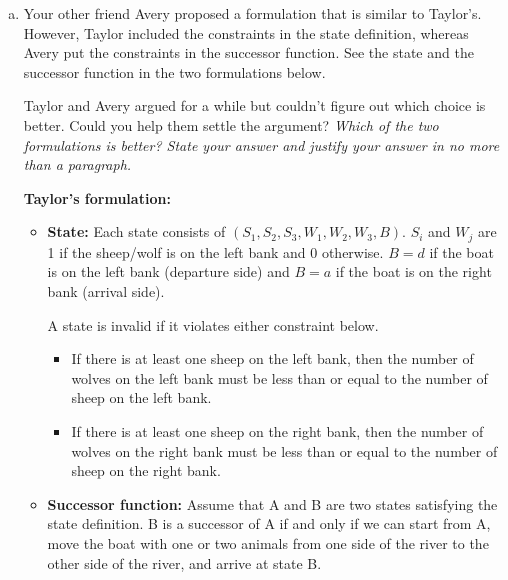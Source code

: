\documentclass[12pt]{article}
\begin{document}
\begin{enumerate}[(a)]
\item
\label{mc_part_critique_formulation_2}
Your other friend Avery proposed a formulation that is similar to Taylor's. However, Taylor included the constraints in the state definition, whereas Avery put the constraints in the successor function. See the state and the successor function in the two formulations below.

Taylor and  Avery argued for a while but couldn't figure out which choice is better. Could you help them settle the argument? {\em Which of the two formulations is better? State your answer and justify your answer in no more than a paragraph.}

\begin{example}
{\bf Taylor's formulation:}

\begin{itemize}
\item
{\bf State:} Each state consists of $(S_1, S_2, S_3, W_1, W_2, W_3, B)$. $S_i$ and $W_j$ are 1 if the sheep/wolf is on the left bank and 0 otherwise. $B = d$ if the boat is on the left bank (departure side) and $B = a$ if the boat is on the right bank (arrival side). 

A state is invalid if it violates either constraint below.

\begin{itemize}
\item 
If there is at least one sheep on the left bank, then the number of wolves on the left bank must be less than or equal to the number of sheep on the left bank. 

\item
If there is at least one sheep on the right bank, then the number of wolves on the right bank must be less than or equal to the number of sheep on the right bank. 
\end{itemize}

\item
{\bf Successor function:} Assume that A and B are two states satisfying the state definition. B is a successor of A if and only if we can start from A, move the boat with one or two animals from one side of the river to the other side of the river, and arrive at state B. 

\end{itemize}

\end{example}


\end{enumerate}
\end{document}
